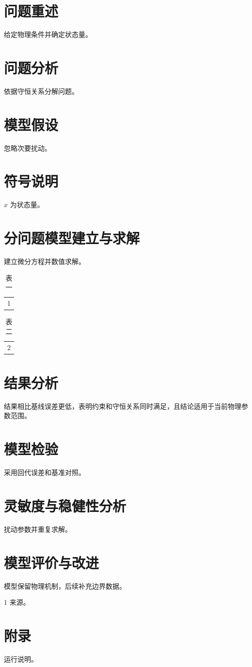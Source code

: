 \documentclass{ctexart}
\begin{document}
\begin{abstract}针对机理问题建立微分方程，并以误差检验结果。\end{abstract}
\section{问题重述}给定物理条件并确定状态量。
\section{问题分析}依据守恒关系分解问题。
\section{模型假设}忽略次要扰动。
\section{符号说明}$x$ 为状态量。
\section{分问题模型建立与求解}建立微分方程并数值求解。
\begin{table}\caption{表一}\label{tab:duplicate}\begin{tabular}{c}1\end{tabular}\end{table}
\begin{table}\caption{表二}\label{tab:duplicate}\begin{tabular}{c}2\end{tabular}\end{table}
\section{结果分析}结果相比基线误差更低，表明约束和守恒关系同时满足，且结论适用于当前物理参数范围。
\section{模型检验}采用回代误差和基准对照。
\section{灵敏度与稳健性分析}扰动参数并重复求解。
\section{模型评价与改进}模型保留物理机制，后续补充边界数据。
\begin{thebibliography}{1} 来源。\end{thebibliography}
\appendix\section{附录}运行说明。
\end{document}
